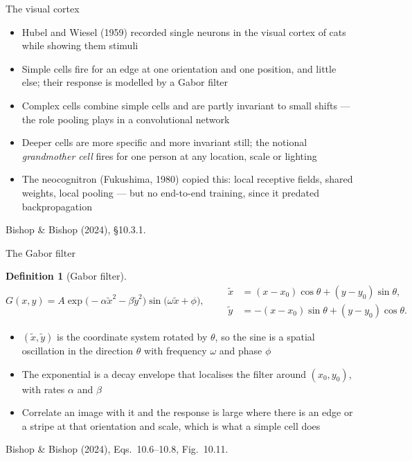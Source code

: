 \documentclass[aspectratio=169, 11pt]{beamer}
\newtheorem{defx}[theorem]{Definition}
\newcommand{\srcline}[1]{%
  \par\vspace{0.25em}%
  {\scriptsize\color{mcMuted}\hfill #1\par}}
\newcommand{\src}[3]{}      %
\begin{document}
\begin{frame}{The visual cortex}
  \src{bishop2024}{section}{10.3.1}
  \vspace{0.1em}
  {\footnotesize
  \begin{itemize}\itemsep0.28em
    \item Hubel and Wiesel (1959) recorded single neurons in the visual
          cortex of cats while showing them stimuli
    \item \alert{Simple cells} fire for an edge at one orientation and
          one position, and little else; their response is modelled by
          a Gabor filter
    \item \alert{Complex cells} combine simple cells and are partly
          invariant to small shifts --- the role pooling plays in a
          convolutional network
    \item Deeper cells are more specific and more invariant still; the
          notional \emph{grandmother cell} fires for one person at any
          location, scale or lighting
    \item The neocognitron (Fukushima, 1980) copied this: local
          receptive fields, shared weights, local pooling --- but no
          end-to-end training, since it predated backpropagation
  \end{itemize}}
  \srcline{Bishop \& Bishop (2024), \S10.3.1.}
\end{frame}

\begin{frame}{The Gabor filter}
  \src{bishop2024}{equation}{10.6-10.8}
  \src{bishop2024}{section}{10.3.1}
  \vspace{-0.3em}
  \begin{defx}[Gabor filter]\label{th:gabor}
    \small
    \[
      G(x, y) = A \exp\!\big( -\alpha \tilde{x}^2 - \beta \tilde{y}^2 \big)
                \sin\!\big( \omega \tilde{x} + \phi \big),
      \qquad
      \begin{aligned}
        \tilde{x} &= (x - x_0)\cos\theta + (y - y_0)\sin\theta,\\
        \tilde{y} &= -(x - x_0)\sin\theta + (y - y_0)\cos\theta.
      \end{aligned}
    \]
  \end{defx}
  \vspace{0.05em}
  {\footnotesize
  \begin{itemize}\itemsep0.22em
    \item $(\tilde{x}, \tilde{y})$ is the coordinate system rotated by
          $\theta$, so the sine is a spatial oscillation in the
          direction $\theta$ with frequency $\omega$ and phase $\phi$
    \item The exponential is a decay envelope that localises the
          filter around $(x_0, y_0)$, with rates $\alpha$ and $\beta$
    \item Correlate an image with it and the response is large where
          there is an edge or a stripe at that orientation and scale,
          which is what a simple cell does
  \end{itemize}}
  \srcline{Bishop \& Bishop (2024), Eqs.~10.6--10.8, Fig.~10.11.}
\end{frame}
\end{document}
